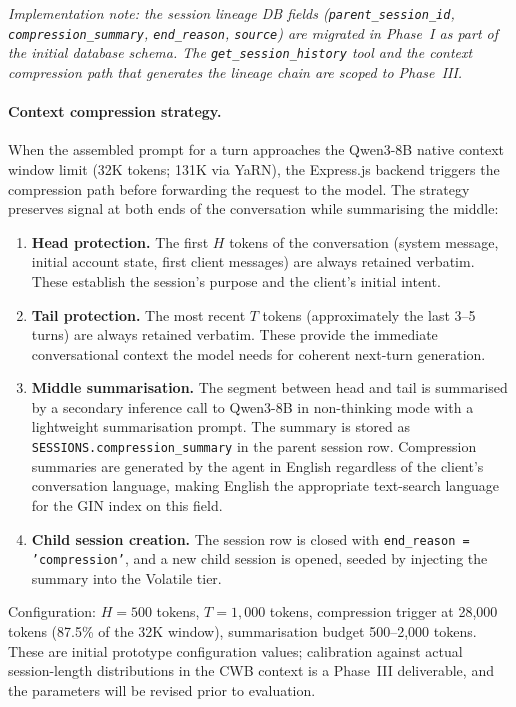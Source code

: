 \documentclass[12pt,a4paper]{report}
\begin{document}
\textit{Implementation note: the session lineage DB fields
(\texttt{parent\_session\_id}, \texttt{compression\_summary}, \texttt{end\_reason},
\texttt{source}) are migrated in Phase~I as part of the initial database schema.
The \texttt{get\_session\_history} tool and the context compression path that
generates the lineage chain are scoped to Phase~III.}

\paragraph{Context compression strategy.}

When the assembled prompt for a turn approaches the Qwen3-8B native context window
limit (32K tokens; 131K via YaRN), the Express.js backend triggers the compression
path before forwarding the request to the model. The strategy preserves signal at
both ends of the conversation while summarising the middle:

\begin{enumerate}[noitemsep]
\item \textbf{Head protection.} The first $H$ tokens of the conversation (system
message, initial account state, first client messages) are always retained verbatim.
These establish the session's purpose and the client's initial intent.
\item \textbf{Tail protection.} The most recent $T$ tokens (approximately the last
3--5 turns) are always retained verbatim. These provide the immediate conversational
context the model needs for coherent next-turn generation.
\item \textbf{Middle summarisation.} The segment between head and tail is summarised
by a secondary inference call to Qwen3-8B in non-thinking mode with a lightweight
summarisation prompt. The summary is stored as \texttt{SESSIONS.compression\_summary}
in the parent session row. Compression summaries are generated by the agent in
English regardless of the client's conversation language, making English the
appropriate text-search language for the GIN index on this field.
\item \textbf{Child session creation.} The session row is closed with
\texttt{end\_reason = 'compression'}, and a new child session is opened, seeded
by injecting the summary into the Volatile tier.
\end{enumerate}

\noindent Configuration: $H = 500$ tokens, $T = 1{,}000$ tokens, compression
trigger at 28{,}000 tokens (87.5\% of the 32K window), summarisation budget
500--2{,}000 tokens. These are initial prototype configuration values; calibration
against actual session-length distributions in the CWB context is a Phase~III
deliverable, and the parameters will be revised prior to evaluation.
\end{document}

